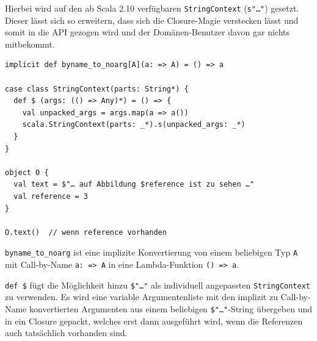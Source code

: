 Hierbei wird auf den ab Scala 2.10 verfügbaren
\lstinline|StringContext| (\lstinline|s"…"|)
gesetzt. \cite{scala-stringInterpolation}
Dieser lässt sich so erweitern, dass
sich die Closure-Magie verstecken lässt und somit in die API
gezogen wird und der Domänen-Benutzer davon gar nichts mitbekommt.

\begin{lstlisting}
implicit def byname_to_noarg[A](a: => A) = () => a

case class StringContext(parts: String*) {
  def $ (args: (() => Any)*) = () => {
    val unpacked_args = args.map(a => a())
    scala.StringContext(parts: _*).s(unpacked_args: _*)
  }
}

object O {
  val text = $"… auf Abbildung $reference ist zu sehen …"
  val reference = 3
}

O.text()  // wenn reference vorhanden
\end{lstlisting}

\lstinline|byname_to_noarg| ist eine implizite Konvertierung von einem
beliebigen Typ \lstinline|A| mit Call-by-Name
\lstinline|a: => A| in eine Lambda-Funktion \lstinline|() => a|.

\lstinline|def $| fügt die Möglichkeit hinzu \lstinline|$"…"| als individuell angepassten \lstinline|StringContext| zu verwenden. Es wird eine variable 
Argumentenliste mit den implizit zu Call-by-Name konvertierten Argumenten
aus einem beliebigen \lstinline|$"…"|-String übergeben und in ein Closure gepackt,
welches erst dann ausgeführt wird, wenn die Referenzen auch tatsächlich
vorhanden sind.



